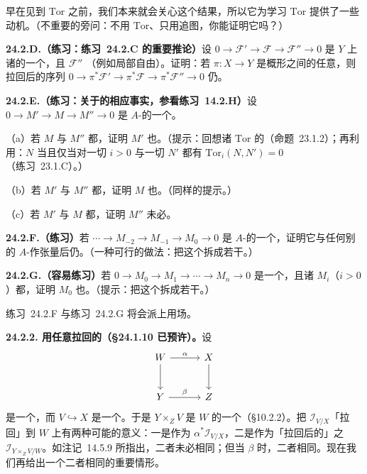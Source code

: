 早在见到 $\mathrm{Tor}$ 之前，我们本来就会关心这个结果，所以它为学习 $\mathrm{Tor}$ 提供了一些动机。（不重要的旁问：不用 $\mathrm{Tor}$、只用追图，你能证明它吗？）

\textbf{24.2.D.（练习：\mbox{练习~24.2.C} 的重要推论）}\quad 设 $0\to\mathscr{F}'\to\mathscr{F}\to\mathscr{F}''\to 0$ 是\trScheme{} $Y$ 上诸\trQCSheaf{}的一个\trShortExactSequence，且 $\mathscr{F}''$ \trFlat（例如局部自由）。证明：若 $\pi\colon X\to Y$ 是概形之间的任意\trMorphism，则拉回后的序列 $0\to\pi^*\mathscr{F}'\to\pi^*\mathscr{F}\to\pi^*\mathscr{F}''\to 0$ 仍\trExact。

\textbf{24.2.E.（练习：关于\trVectorBundle{}的相应事实，参看\mbox{练习~14.2.H}）}\quad 设 $0\to M'\to M\to M''\to 0$ 是 $A$-\trModule{}的一个\trExactSequence。

（a）若 $M$ 与 $M''$ 都\trFlat，证明 $M'$ 也\trFlat。（提示：回想诸 $\mathrm{Tor}$ 的\trLongExactSequence（\mbox{命题~23.1.2}）；再利用：$N$ \trFlat{}当且仅当对一切 $i>0$ 与一切 $N'$ 都有 $\mathrm{Tor}_i(N,N')=0$（\mbox{练习~23.1.C}）。）

（b）若 $M'$ 与 $M''$ 都\trFlat，证明 $M$ 也\trFlat。（同样的提示。）

（c）若 $M'$ 与 $M$ 都\trFlat，证明 $M''$ 未必\trFlat。

\textbf{24.2.F.（练习）}\quad 若 $\cdots\to M_{-2}\to M_{-1}\to M_0\to 0$ 是\trFlat{} $A$-\trModule{}的一个\trExactSequence，证明它与任何别的 $A$-\trModule{}作张量后仍\trExact。（一种可行的做法：把这个\trExactSequence{}拆成若干\trShortExactSequence。）

\textbf{24.2.G.（容易练习）}\quad 若 $0\to M_0\to M_1\to\cdots\to M_n\to 0$ 是一个\trExactSequence，且诸 $M_i$（$i>0$）都\trFlat，证明 $M_0$ 也\trFlat。（提示：把这个\trExactSequence{}拆成若干\trShortExactSequence。）

\mbox{练习~24.2.F} 与\mbox{练习~24.2.G} 将会派上用场。

\textbf{24.2.2. 用任意\trMorphism{}拉回\trFlat\trClosedSubscheme{}的\trQC\trIdealSheaf（\S24.1.10 已预许）。}\quad 设
\[
\begin{tikzcd}[row sep=2.6em, column sep=3em]
W \ar[r, "\alpha"] \ar[d] & X \ar[d] \\
Y \ar[r, "\beta"] & Z
\end{tikzcd}
\]
是一个\trFiberProduct，而 $V\hookrightarrow X$ 是一个\trClosedSubscheme。于是 $Y\times_Z V$ 是 $W$ 的一个\trClosedSubscheme（\S10.2.2）。把 $\mathscr{I}_{V/X}$「拉回」到 $W$ 上有两种可能的意义：一是作为\trQCSheaf{} $\alpha^*\mathscr{I}_{V/X}$，二是作为「拉回后的」\trClosedSubscheme{}之\trIdealSheaf{} $\mathscr{I}_{Y\times_Z V/W}$。如\mbox{注记~14.5.9} 所指出，二者未必相同；但当 $\beta$ \trFlat{}时，二者相同。现在我们再给出一个二者相同的重要情形。

